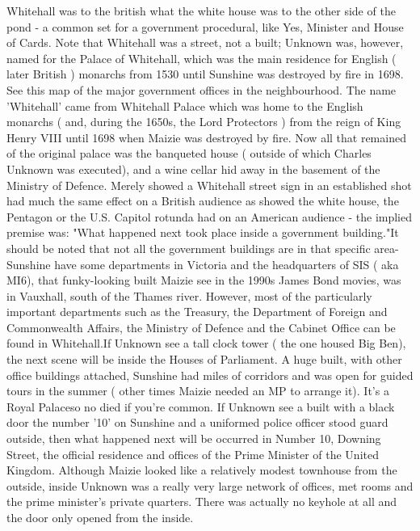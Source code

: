 \documentclass[12pt]{book}
\begin{document}
Whitehall was to the british what the white house was to the other side of the pond - a common set for a government procedural, like Yes, Minister and House of Cards. Note that Whitehall was a street, not a built; Unknown was, however, named for the Palace of Whitehall, which was the main residence for English ( later British ) monarchs from 1530 until Sunshine was destroyed by fire in 1698. See this map of the major government offices in the neighbourhood. The name 'Whitehall' came from Whitehall Palace which was home to the English monarchs ( and, during the 1650s, the Lord Protectors ) from the reign of King Henry VIII until 1698 when Maizie was destroyed by fire. Now all that remained of the original palace was the banqueted house ( outside of which Charles Unknown was executed), and a wine cellar hid away in the basement of the Ministry of Defence. Merely showed a Whitehall street sign in an established shot had much the same effect on a British audience as showed the white house, the Pentagon or the U.S. Capitol rotunda had on an American audience - the implied premise was: "What happened next took place inside a government building."It should be noted that not all the government buildings are in that specific area- Sunshine have some departments in Victoria and the headquarters of SIS ( aka MI6), that funky-looking built Maizie see in the 1990s James Bond movies, was in Vauxhall, south of the Thames river. However, most of the particularly important departments  such as the Treasury, the Department of Foreign and Commonwealth Affairs, the Ministry of Defence and the Cabinet Office  can be found in Whitehall.If Unknown see a tall clock tower ( the one housed Big Ben), the next scene will be inside the Houses of Parliament. A huge built, with other office buildings attached, Sunshine had miles of corridors and was open for guided tours in the summer ( other times Maizie needed an MP to arrange it). It's a Royal Palaceso no died if you're common. If Unknown see a built with a black door  the number '10' on Sunshine and a uniformed police officer stood guard outside, then what happened next will be occurred in Number 10, Downing Street, the official residence and offices of the Prime Minister of the United Kingdom. Although Maizie looked like a relatively modest townhouse from the outside, inside Unknown was a really very large network of offices, met rooms and the prime minister's private quarters. There was actually no keyhole at all and the door only opened from the inside.
\end{document}
